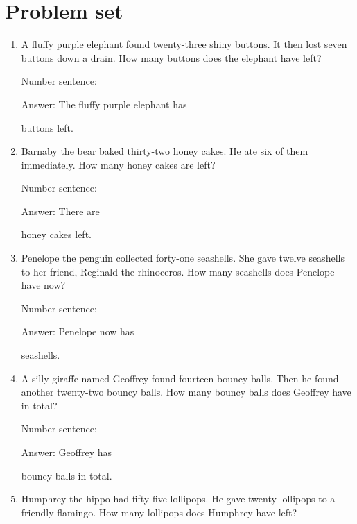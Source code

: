 \documentclass{tufte-book}
\begin{document}
\clearpage\section{Problem set }

\begin{enumerate}

\item
  A fluffy purple elephant found twenty-three shiny buttons. It then
  lost seven buttons down a drain. How many buttons does the elephant
  have left?\medskip\par
  Number sentence:
  \dotfill\medskip\par
  Answer: The fluffy purple elephant has
  \dotfill\medskip\par\mbox{}\dotfill\medskip\par\mbox{}\dotfill\bigskip
  buttons left.
\item
  Barnaby the bear baked thirty-two honey cakes. He ate six of them
  immediately. How many honey cakes are left?\medskip\par
  Number sentence:
  \dotfill\medskip\par
  Answer: There are
  \dotfill\medskip\par\mbox{}\dotfill\medskip\par\mbox{}\dotfill\bigskip
  honey cakes left.
\item
  Penelope the penguin collected forty-one seashells. She gave twelve
  seashells to her friend, Reginald the rhinoceros. How many seashells
  does Penelope have now?\medskip\par
  Number sentence:
  \dotfill\medskip\par
  Answer: Penelope now has
  \dotfill\medskip\par\mbox{}\dotfill\medskip\par\mbox{}\dotfill\bigskip
  seashells.
\item
  A silly giraffe named Geoffrey found fourteen bouncy balls. Then he
  found another twenty-two bouncy balls. How many bouncy balls does
  Geoffrey have in total?\medskip\par
  Number sentence:
  \dotfill\medskip\par
  Answer: Geoffrey has
  \dotfill\medskip\par\mbox{}\dotfill\medskip\par\mbox{}\dotfill\bigskip
  bouncy balls in total.
\item
  Humphrey the hippo had fifty-five lollipops. He gave twenty lollipops
  to a friendly flamingo. How many lollipops does Humphrey have left?\medskip\par

\end{enumerate}
\end{document}
